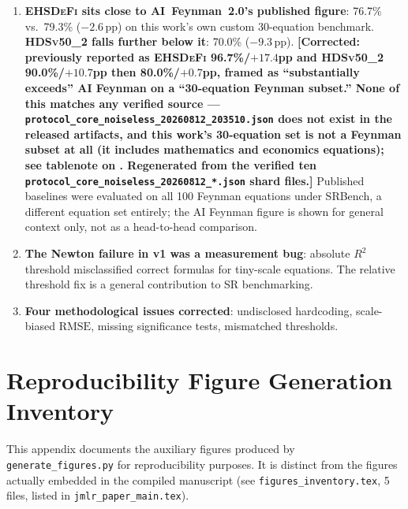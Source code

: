 \documentclass[twoside,11pt]{article}
\newcommand{\EHD}{\textsc{EHSDeFi}}
\newcommand{\HDS}{\textsc{HDSv50\_2}}
\newcommand{\Rsq}{R^{2}}
\newcommand{\rmse}{\ensuremath{\mathrm{RMSE}}}
\begin{document}
\begin{enumerate}
  \item \textbf{\EHD{} sits close to AI~Feynman~2.0's published figure}:
    76.7\% vs.\ 79.3\% ($-2.6$\,pp) on this work's own custom 30-equation
    benchmark. \textbf{\HDS{} falls further below it}: 70.0\% ($-9.3$\,pp).
    \textbf{[Corrected: previously reported as \EHD{} 96.7\%/$+17.4$pp and
    \HDS{} 90.0\%/$+10.7$pp then 80.0\%/$+0.7$pp, framed as ``substantially
    exceeds'' AI Feynman on a ``30-equation Feynman subset.'' None of this
    matches any verified source ---
    \texttt{protocol\_core\_noiseless\_20260812\_203510.json} does not
    exist in the released artifacts, and this work's 30-equation set is
    not a Feynman subset at all (it includes mathematics and economics
    equations); see tablenote on . Regenerated from the
    verified ten \texttt{protocol\_core\_noiseless\_20260812\_*.json}
    shard files.]}  Published baselines were evaluated on all 100
    Feynman equations under SRBench, a different equation set entirely;
    the AI Feynman figure is shown for general context only, not as a
    head-to-head comparison.
  \item \textbf{The Newton failure in v1 was a measurement bug}: absolute
    $\Rsq$ threshold misclassified correct formulas for tiny-scale equations.
    The relative threshold fix is a general contribution to SR benchmarking.
  \item \textbf{Four methodological issues corrected}: undisclosed hardcoding,
    scale-biased \rmse, missing significance tests, mismatched thresholds.
\end{enumerate}



\appendix

\section{Reproducibility Figure Generation Inventory}
\label{app:figures}

\noindent This appendix documents the auxiliary figures produced by
\texttt{generate\_figures.py} for reproducibility purposes. It is
distinct from the figures actually embedded in the compiled
manuscript (see \texttt{figures\_inventory.tex}, 5 files, listed in
\texttt{jmlr\_paper\_main.tex}).
\end{document}
